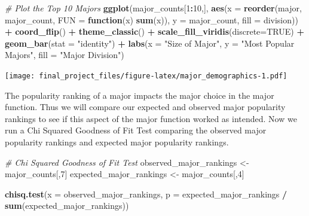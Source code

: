 \documentclass[
  twocolumn]{article}
\newenvironment{Shaded}{\begin{snugshade}}{\end{snugshade}}
\newcommand{\AttributeTok}[1]{\textcolor[rgb]{0.13,0.29,0.53}{#1}}
\newcommand{\CommentTok}[1]{\textcolor[rgb]{0.56,0.35,0.01}{\textit{#1}}}
\newcommand{\ConstantTok}[1]{\textcolor[rgb]{0.56,0.35,0.01}{#1}}
\newcommand{\ControlFlowTok}[1]{\textcolor[rgb]{0.13,0.29,0.53}{\textbf{#1}}}
\newcommand{\DecValTok}[1]{\textcolor[rgb]{0.00,0.00,0.81}{#1}}
\newcommand{\FunctionTok}[1]{\textcolor[rgb]{0.13,0.29,0.53}{\textbf{#1}}}
\newcommand{\NormalTok}[1]{#1}
\newcommand{\OtherTok}[1]{\textcolor[rgb]{0.56,0.35,0.01}{#1}}
\newcommand{\SpecialCharTok}[1]{\textcolor[rgb]{0.81,0.36,0.00}{\textbf{#1}}}
\newcommand{\StringTok}[1]{\textcolor[rgb]{0.31,0.60,0.02}{#1}}
\begin{document}
\begin{Shaded}
\begin{Highlighting}[]
\CommentTok{\# Plot the Top 10 Majors}
\FunctionTok{ggplot}\NormalTok{(major\_counts[}\DecValTok{1}\SpecialCharTok{:}\DecValTok{10}\NormalTok{,], }\FunctionTok{aes}\NormalTok{(}\AttributeTok{x =} \FunctionTok{reorder}\NormalTok{(major, major\_count, }\AttributeTok{FUN =} \ControlFlowTok{function}\NormalTok{(x) }\FunctionTok{sum}\NormalTok{(x)),}
                                \AttributeTok{y =}\NormalTok{ major\_count,}
                                \AttributeTok{fill =}\NormalTok{ division)) }\SpecialCharTok{+}
  \FunctionTok{coord\_flip}\NormalTok{() }\SpecialCharTok{+}
  \FunctionTok{theme\_classic}\NormalTok{() }\SpecialCharTok{+}
  \FunctionTok{scale\_fill\_viridis}\NormalTok{(}\AttributeTok{discrete=}\ConstantTok{TRUE}\NormalTok{) }\SpecialCharTok{+}
  \FunctionTok{geom\_bar}\NormalTok{(}\AttributeTok{stat =} \StringTok{"identity"}\NormalTok{) }\SpecialCharTok{+}
  \FunctionTok{labs}\NormalTok{(}\AttributeTok{x =} \StringTok{"Size of Major"}\NormalTok{,}
       \AttributeTok{y =} \StringTok{"Most Popular Majors"}\NormalTok{,}
       \AttributeTok{fill =} \StringTok{"Major Division"}\NormalTok{)}
\end{Highlighting}
\end{Shaded}

\texttt{[image: final\_project\_files/figure-latex/major\_demographics-1.pdf]}

The popularity ranking of a major impacts the major choice in the major
function. Thus we will compare our expected and observed major
popularity rankings to see if this aspect of the major function worked
as intended. Now we run a Chi Squared Goodness of Fit Test comparing the
observed major popularity rankings and expected major popularity
rankings.

\begin{Shaded}
\begin{Highlighting}[]
\CommentTok{\# Chi Squared Goodness of Fit Test}
\NormalTok{observed\_major\_rankings }\OtherTok{\textless{}{-}}\NormalTok{ major\_counts[,}\DecValTok{7}\NormalTok{]}
\NormalTok{expected\_major\_rankings }\OtherTok{\textless{}{-}}\NormalTok{ major\_counts[,}\DecValTok{4}\NormalTok{]}

\FunctionTok{chisq.test}\NormalTok{(}\AttributeTok{x =}\NormalTok{ observed\_major\_rankings, }\AttributeTok{p =}\NormalTok{ expected\_major\_rankings }\SpecialCharTok{/} \FunctionTok{sum}\NormalTok{(expected\_major\_rankings))}
\end{Highlighting}
\end{Shaded}
\end{document}
